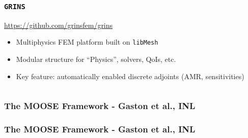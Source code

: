 \begin{frame}
\frametitle{\texttt{GRINS}}

\begin{block}{\url{https://github.com/grinsfem/grins}}
  \begin{itemize}
  \item Multiphysics FEM platform built on \texttt{libMesh}
  \item Modular structure for ``Physics'', solvers, QoIs, etc.
  \item Key feature: automatically enabled discrete adjoints (AMR, sensitivities)
  \end{itemize}
\end{block}

\begin{columns}[T]
  \begin{column}{0.4\textwidth}
  \end{column}
  \begin{column}{0.4\textwidth}
  \end{column}
  \begin{column}{0.2\textwidth}
  \end{column}
  \end{columns}

\end{frame}



\frame
{
  \frametitle{The MOOSE Framework - Gaston et al., INL}
  \begin{center}
  \end{center}
}






\frame
{
  \frametitle{The MOOSE Framework - Gaston et al., INL}
  \begin{center}
  \end{center}
}

